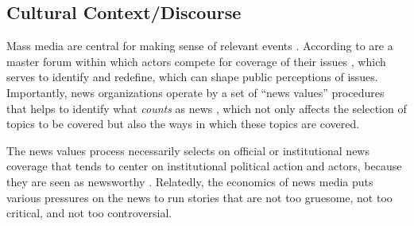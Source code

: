 


\subsection{Cultural Context/Discourse}

Mass media are central for making sense of relevant events \citep{gamson_and_modigliani_1989}. According to \citet{ferree_et_al_2002} are a master forum within which actors compete for coverage of their issues \citep{amenta_et_al_2012}, which serves to identify and redefine, which can shape public perceptions of issues. Importantly, news organizations operate by a set of ``news values'' procedures that helps to identify what \textit{counts} as news \citep{amenta_et_al_2012,galtung_and_ruge_1965}, which not only affects the selection of topics to be covered \citep{galtung_and_ruge_1965} but also the ways in which these topics are covered.

The news values process necessarily selects on official or institutional news coverage \citep{schudson_2002,gitlin_1980,gans_1979} that tends to center on institutional political action and actors, because they are seen as newsworthy \citep{amenta_et_al_2012}. Relatedly, the economics of news media puts various pressures on the news to run stories that are not too gruesome, not too critical, and not too controversial. 

